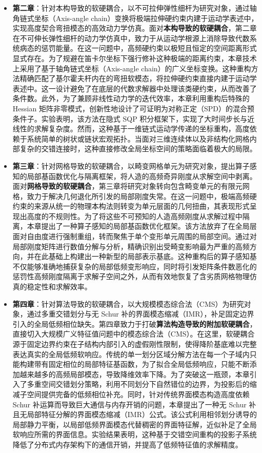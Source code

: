 \begin{itemize}
    \item \textbf{第二章}：针对本构导致的软硬耦合，以不可拉伸弹性细杆为研究对象，通过轴角链式坐标（Axis-angle chain）变换将极端拉伸硬约束内建于运动学表述中，实现高度契合弯扭模态的高效动力学仿真。面对\textbf{本构导致的软硬耦合}，第二章在不可伸长弹性细杆的动力学仿真中，致力于从运动学根源上消除导致代数系统病态的惩罚能量。在这一问题中，高频硬约束以极短且恒定的空间距离形式显式存在。为了规避在笛卡尔坐标下强行修补这种极端的距离约束，本章技术上采用了基于轴角链式坐标（Axis-angle chain）的广义坐标变换。这种重构方法精确匹配了基尔霍夫杆内在的弯扭软模态，将拉伸硬约束直接内建于运动学表述中。这一设计避免了在底层的代数求解器中处理该类硬约束，从而改善了条件数。此外，为了兼顾非线性动力学的迭代效率，本章利用重构后特殊的 Hessian 矩阵非零模式，创新性地设计了可证明为对称正定（SPD）的混合预条件子。实验表明，该方法在隐式 SQP 积分框架下，实现了大时间步长与近线性的求解复杂度。然而，这种基于一维链式运动学传递的坐标重构，高度依赖于系统简单的树状或链状宏观拓扑。当面对三维连续体以及非结构化网格内部复杂的交错连接时，这种直接修改全局坐标空间的策略面临着极大的局限。

    \item \textbf{第三章}：针对网格导致的软硬耦合，以畸变网格单元为研究对象，提出算子感知的局部基函数优化与隔离框架，将人造的高频奇异刚度从求解空间中剥离。面对\textbf{网格导致的软硬耦合}，第三章将研究对象转向包含畸变单元的有限元网格，致力于解决几何退化所引发的局部刚度失常。在这一问题中，极端高频硬约束的来源从统一的物理本构法则转变为单元层面的几何扭曲，其表现形式呈现出高度的不规则性。为了将这些不可预知的人造高频刚度从求解过程中隔离，本章提出了一种算子感知的局部基函数优化框架。该方法放弃了在全局层面对自由度进行强制重组，转而聚焦于单个变形单元周围的局部空间。通过对局部刚度矩阵进行数值分解与分析，精确识别出受畸变影响最为严重的高频方向，并在此基础上构建出一种新型的局部表示基底。这种重构后的算子感知基不仅能够准确地捕获复杂的局部低频变形响应，同时将引发矩阵条件数恶化的惩罚性高频刚度隔离于求解子空间之外，从而有效地恢复了含劣质网格物理仿真的稳定性和求解效率。

    \item \textbf{第四章}：针对算法导致的软硬耦合，以大规模模态综合法（CMS）为研究对象，通过多重交错划分与无 Schur 补的界面模态缩减（IMR），补足固定边界引入的全局低频相位缺失。第四章致力于打破\textbf{算法构造导致的附加软硬耦合}，直接切入大规模广义特征值问题中的模态综合法（CMS）。在这里，软硬耦合源于固定边界约束在子结构内部引入的虚假刚性限制，使得降阶基底难以完整表达真实的全局低频软响应。传统的单一划分区域分解方法在每一个子域内只能构建带有固定相位的局部特征基函数，为了拟合全局低频响应，只能不断添加越来越多的高频局部模态，导致降维效率下降。为了突破这一瓶颈，本章引入了多重空间交错划分策略，利用不同划分下自然错位的边界，为投影后的缩减子空间提供完备的低频相位补充。同时，针对传统界面模态构造高度依赖 Schur 补运算而导致巨大通信与内存开销的问题，本章提出了一种无 Schur 补且无局部特征分解的界面模态缩减（IMR）公式。该公式利用相邻划分诱导的局部静力平衡，以局部低频界面模态代替稠密的界面特征解，近似补足了全局软响应所需的界面信息。实验结果表明，这种基于交错空间重构的投影子系统降低了分布式内存架构下的通信开销，并提高了低频特征值的求解精度。
\end{itemize}

